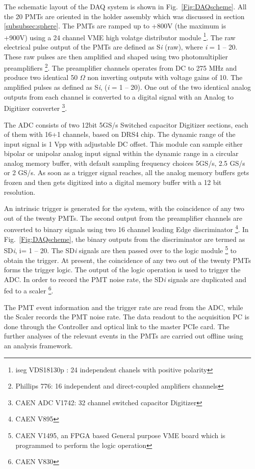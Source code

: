 The schematic layout 
of the DAQ system is shown in Fig.~{\ref{Fig:DAQscheme}}. All the 20 PMTs 
are oriented in the holder assembly which was discussed in section \ref{subsubsec:sphere}. 
The PMTs are ramped up to +800V (the maximum is +900V) using a 24 channel 
VME high volatge distributor module \footnote{iseg VDS18130p : 24 independent chanels with positive polarity}.  
The raw electrical pulse output of the PMTs are defined as S{\it i} (raw), where {\it i} = 1 -- 20. 
These raw pulses are then 
amplified and shaped using two photomultiplier preamplifiers \footnote{Phillips 776: 16 independent  and direct-coupled 
amplifiers channels}. The preamplifier channels operates from DC to 275 MHz and 
produce two identical 50 $\Omega$ non inverting outputs with voltage gains of 10. 
The amplified pulses as defined as S{\it i}, ({\it i} = 1 -- 20). One out of the 
two identical analog outputs from each channel is converted to a digital 
signal with an Analog to Digitizer converter \footnote{CAEN ADC V1742: 32 channel switched capacitor Digitizer}. 

The ADC consists of two 12bit 5GS/s Switched capacitor Digitizer sections, 
each of them with 16+1 channels, based on DRS4 chip. The dynamic range of the input 
signal is 1 Vpp with adjustable DC offset. This module can sample either bipolar or 
unipolar analog input signal within the dynamic range in a circular 
analog memory buffer, with default sampling frequency choices 5GS/s, 2.5 GS/s 
or 2 GS/s. As soon as a trigger signal reaches, all the analog memory 
buffers gets frozen and then gets digitized into a digital memory buffer 
with a 12 bit resolution. 

An intrinsic trigger is generated for the system, 
with the coincidence of any two out of the twenty PMTs. The second output from the 
preamplifier channels are converted to binary signals using two 16 channel leading 
Edge discriminator \footnote{CAEN V895}. In Fig.~\ref{Fig:DAQscheme}, the binary 
outputs from the discriminator are termed as SD{\it i}, i= 1 -- 20. The SD{\it i} signals are then passed over to 
the logic module \footnote{CAEN V1495, an FPGA based General purpose VME board which is programmed to perform the 
logic operation} to obtain the trigger. At present, the coincidence of any two out 
of the twenty PMTs forms the trigger logic. The output of the logic operation is 
used to trigger the ADC. In order to record the PMT noise rate, the 
SD{\it i} signals are duplicated and fed to a scaler \footnote{CAEN V830}.

The PMT event information and the trigger rate are read from the ADC, while the Scaler 
records the PMT noise rate. The data readout to the acquisition PC is done through the 
Controller and optical link to the master PCIe card. The further analyses of the 
relevant events in the PMTs are carried out offline using an analysis 
framework.





